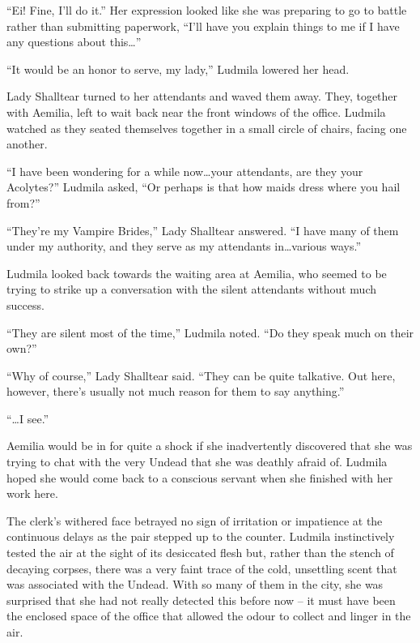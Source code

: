  

“Ei! Fine, I’ll do it.” Her expression looked like she was preparing to go to battle rather than submitting paperwork, “I’ll have you explain things to me if I have any questions about this…”

 

“It would be an honor to serve, my lady,” Ludmila lowered her head.

 

Lady Shalltear turned to her attendants and waved them away. They, together with Aemilia, left to wait back near the front windows of the office. Ludmila watched as they seated themselves together in a small circle of chairs, facing one another.

 

“I have been wondering for a while now…your attendants, are they your Acolytes?” Ludmila asked, “Or perhaps is that how maids dress where you hail from?”

 

“They’re my Vampire Brides,” Lady Shalltear answered. “I have many of them under my authority, and they serve as my attendants in…various ways.”

 

Ludmila looked back towards the waiting area at Aemilia, who seemed to be trying to strike up a conversation with the silent attendants without much success.

 

“They are silent most of the time,” Ludmila noted. “Do they speak much on their own?”

 

“Why of course,” Lady Shalltear said. “They can be quite talkative. Out here, however, there’s usually not much reason for them to say anything.”

 

“…I see.”

 

Aemilia would be in for quite a shock if she inadvertently discovered that she was trying to chat with the very Undead that she was deathly afraid of. Ludmila hoped she would come back to a conscious servant when she finished with her work here.

 

The clerk’s withered face betrayed no sign of irritation or impatience at the continuous delays as the pair stepped up to the counter. Ludmila instinctively tested the air at the sight of its desiccated flesh but, rather than the stench of decaying corpses, there was a very faint trace of the cold, unsettling scent that was associated with the Undead. With so many of them in the city, she was surprised that she had not really detected this before now – it must have been the enclosed space of the office that allowed the odour to collect and linger in the air.

